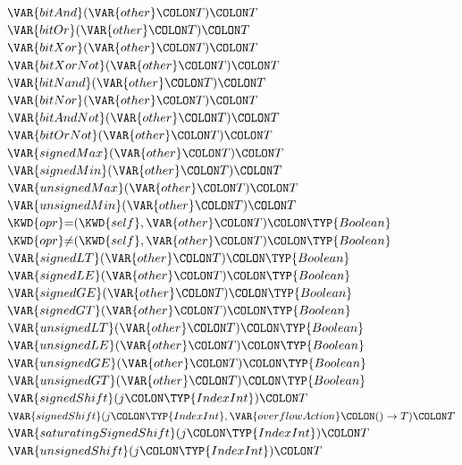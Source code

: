 \begin{Fortress}
\(  \VAR{bitAnd}(\VAR{other}\COLON T)\COLON T\)\\
\(  \VAR{bitOr}(\VAR{other}\COLON T)\COLON T\)\\
\(  \VAR{bitXor}(\VAR{other}\COLON T)\COLON T\)\\
\(  \VAR{bitXorNot}(\VAR{other}\COLON T)\COLON T\)\\
\(  \VAR{bitNand}(\VAR{other}\COLON T)\COLON T\)\\
\(  \VAR{bitNor}(\VAR{other}\COLON T)\COLON T\)\\
\(  \VAR{bitAndNot}(\VAR{other}\COLON T)\COLON T\)\\
\(  \VAR{bitOrNot}(\VAR{other}\COLON T)\COLON T\)\\
\(  \VAR{signedMax}(\VAR{other}\COLON T)\COLON T\)\\
\(  \VAR{signedMin}(\VAR{other}\COLON T)\COLON T\)\\
\(  \VAR{unsignedMax}(\VAR{other}\COLON T)\COLON T\)\\
\(  \VAR{unsignedMin}(\VAR{other}\COLON T)\COLON T\)\\
\(  \KWD{opr} \mathord{=}(\KWD{self},\VAR{other}\COLON T)\COLON \TYP{Boolean}\)\\
\(  \KWD{opr} \mathord{\neq}(\KWD{self},\VAR{other}\COLON T)\COLON \TYP{Boolean}\)\\
\(  \VAR{signedLT}(\VAR{other}\COLON T)\COLON \TYP{Boolean}\)\\
\(  \VAR{signedLE}(\VAR{other}\COLON T)\COLON \TYP{Boolean}\)\\
\(  \VAR{signedGE}(\VAR{other}\COLON T)\COLON \TYP{Boolean}\)\\
\(  \VAR{signedGT}(\VAR{other}\COLON T)\COLON \TYP{Boolean}\)\\
\(  \VAR{unsignedLT}(\VAR{other}\COLON T)\COLON \TYP{Boolean}\)\\
\(  \VAR{unsignedLE}(\VAR{other}\COLON T)\COLON \TYP{Boolean}\)\\
\(  \VAR{unsignedGE}(\VAR{other}\COLON T)\COLON \TYP{Boolean}\)\\
\(  \VAR{unsignedGT}(\VAR{other}\COLON T)\COLON \TYP{Boolean}\)\\
\(  \VAR{signedShift}(j\COLON \TYP{IndexInt})\COLON T\)\\
\(  \VAR{signedShift}(j\COLON \TYP{IndexInt}, \VAR{overflowAction}\COLON ()\rightarrow{}T)\COLON T\)\\
\(  \VAR{saturatingSignedShift}(j\COLON \TYP{IndexInt})\COLON T\)\\
\(  \VAR{unsignedShift}(j\COLON \TYP{IndexInt})\COLON T\)\\

\end{Fortress}
